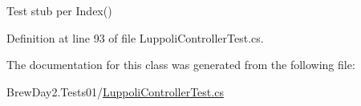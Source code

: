 Test stub per Index()



Definition at line 93 of file Luppoli\+Controller\+Test.\+cs.



The documentation for this class was generated from the following file\+:\begin{DoxyCompactItemize}
\item 
Brew\+Day2.\+Tests01/\mbox{\hyperlink{1_2_luppoli_controller_test_8cs}{Luppoli\+Controller\+Test.\+cs}}\end{DoxyCompactItemize}
